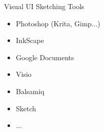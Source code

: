\documentclass[aspectratio=43,handout,bigger]{beamer}
\begin{document}

\begin{frame}{Visual UI Sketching Tools}
  \begin{itemize}
    \item Photoshop (Krita, Gimp...)
    \item InkScape
    \item Google Documents
    \item Visio
    \item Balsamiq
    \item Sketch
    \item ...
  \end{itemize}
\end{frame}


%
%
%
%
%
%
%
%
%
\end{document}
